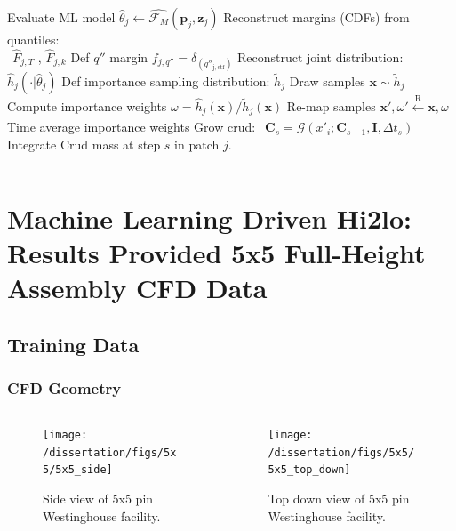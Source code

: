 \documentclass[t, pdftex]{beamer}
\begin{document}
\begin{frame}
\begin{columns}
\begin{column}{0.5\textwidth}
\begin{algorithm}[H]
\begin{algorithmic}[1]
        \STATE Evaluate ML model $\hat \theta_j \leftarrow \hat{\mathcal F_M}(\mathbf p_j, \mathbf z_j)$ 
        \STATE Reconstruct margins (CDFs) from quantiles:  \\
        $\ \ \hat F_{j,T}$ , $\hat F_{j,k}$
        \STATE Def $q''$ margin  $f_{j,q''} = \delta_{(q''_\mathrm{j,ctf})}$
        \STATE Reconstruct joint distribution: $\hat h_j(\cdot |\hat \theta_j)$
        \ENDFOR
        \STATE Def importance sampling distribution: $\tilde h_j$
        \STATE Draw samples $\mathbf x \sim \tilde h_j$ \;
        \STATE Compute importance weights $\omega = \hat h_j(\mathbf x) /  \tilde h_j(\mathbf x) $
        \STATE Re-map samples  $\mathbf x', \omega' \xleftarrow[\text{ }]{\text{R}} \mathbf x, \omega $
        \STATE Time average importance weights
        \STATE Grow crud:
        $\ \ \mathbf C_s = \mathcal G(x'_i; \mathbf C_{s-1}, \mathbf I, \Delta t_s)$ \\
        \STATE Integrate Crud mass at step $s$ in patch $j$.
        \ENDFOR
        \ENDFOR
        \ENDFOR
    \end{algorithmic}
    \label{algo:hi2lo_crud_algo}
\end{algorithm}
    \end{column}
\end{columns}
\end{frame}

\section[ML Results]{Machine Learning Driven Hi2lo: Results Provided 5x5 Full-Height Assembly CFD Data}
\subsection*{Training Data}
\begin{frame}
\frametitle{CFD Geometry}
\vspace*{-32pt}
\begin{columns}
    \begin{column}{0.5\textwidth}
\begin{figure}[H]
    \centering
    \texttt{[image: /dissertation/figs/5x5/5x5\_side]}
    \caption{\centering Side view of 5x5 pin \\ Westinghouse facility.}
    \label{fig:5x5side}
\end{figure}
    \end{column}
\begin{column}{0.5\textwidth}
\begin{figure}[H]
    \centering
    \texttt{[image: /dissertation/figs/5x5/5x5\_top\_down]}
    \caption{\centering Top down view of 5x5 pin \\ Westinghouse facility.}
    \label{fig:5x5topdown}
\end{figure}
\end{column}
\end{columns}
\cite{salko17}
\end{frame}
\end{document}
